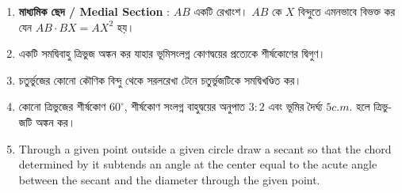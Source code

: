 \documentclass[11pt, a4paper]{article}
\begin{document}
\begin{enumerate}
	\item \textbf{\textbengali{মাধ্যমিক ছেদ} / Medial Section} : $AB$ \textbengali{একটি রেখাংশ।} $AB$ \textbengali{কে}  $X$ \textbengali{বিন্দুতে এমনভাবে বিভক্ত কর যেন} $AB \cdot BX = AX^2$ \textbengali{হয়।}
	
	\item \textbengali{একটি সমদ্বিবাহু ত্রিভুজ অঙ্কন কর যাহার ভূমিসংলগ্ন কোণদ্বয়ের প্রত্যেকে শীর্ষকোণের দ্বিগুণ।}
	
	\item \textbengali{চতুর্ভুজের কোনো কৌণিক বিন্দু থেকে সরলরেখা টেনে চতুর্ভুজটিকে সমদ্বিখণ্ডিত কর।}
	
	\item \textbengali{কোনো ত্রিভুজের শীর্ষকোণ} $60^{\circ}$, \textbengali{শীর্ষকোণ সংলগ্ন বাহুদ্বয়ের অনুপাত} $3:2$ \textbengali{এবং ভূমির দৈর্ঘ্য} $5 c.m.$ \textbengali{হলে ত্রিভুজটি অঙ্কন কর।}
	
	\item Through a given point outside a given circle draw a secant so that the chord determined by it subtends an angle at the center equal to the acute angle between the secant and the diameter through the given point.

\end{enumerate}
\end{document}
